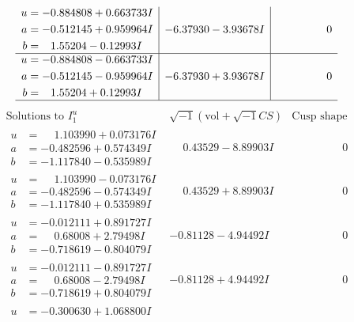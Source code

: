 \documentclass[1p]{elsarticle_modified}
\theoremstyle{definition}
\newcommand{\I}{\sqrt{-1}}
\begin{document}
$$\begin{array}{c|c|c}
\begin{aligned}
u &= -0.884808 + 0.663733 I \\
a &= -0.512145 + 0.959964 I \\
b &= \phantom{-}1.55204 - 0.12993 I\end{aligned}
 & -6.37930 - 3.93678 I & \phantom{-0.000000 } 0 \\ \hline\begin{aligned}
u &= -0.884808 - 0.663733 I \\
a &= -0.512145 - 0.959964 I \\
b &= \phantom{-}1.55204 + 0.12993 I\end{aligned}
 & -6.37930 + 3.93678 I & \phantom{-0.000000 } 0\\
 \hline 
 \end{array}$$\newpage$$\begin{array}{c|c|c}  
\text{Solutions to }I^u_{1}& \I (\text{vol} + \sqrt{-1}CS) & \text{Cusp shape}\\
 \hline 
\begin{aligned}
u &= \phantom{-}1.103990 + 0.073176 I \\
a &= -0.482596 + 0.574349 I \\
b &= -1.117840 - 0.535989 I\end{aligned}
 & \phantom{-}0.43529 - 8.89903 I & \phantom{-0.000000 } 0 \\ \hline\begin{aligned}
u &= \phantom{-}1.103990 - 0.073176 I \\
a &= -0.482596 - 0.574349 I \\
b &= -1.117840 + 0.535989 I\end{aligned}
 & \phantom{-}0.43529 + 8.89903 I & \phantom{-0.000000 } 0 \\ \hline\begin{aligned}
u &= -0.012111 + 0.891727 I \\
a &= \phantom{-}0.68008 + 2.79498 I \\
b &= -0.718619 - 0.804079 I\end{aligned}
 & -0.81128 - 4.94492 I & \phantom{-0.000000 } 0 \\ \hline\begin{aligned}
u &= -0.012111 - 0.891727 I \\
a &= \phantom{-}0.68008 - 2.79498 I \\
b &= -0.718619 + 0.804079 I\end{aligned}
 & -0.81128 + 4.94492 I & \phantom{-0.000000 } 0 \\ \hline\begin{aligned}
u &= -0.300630 + 1.068800 I \\

\end{aligned}
\end{array}$$
\end{document}
